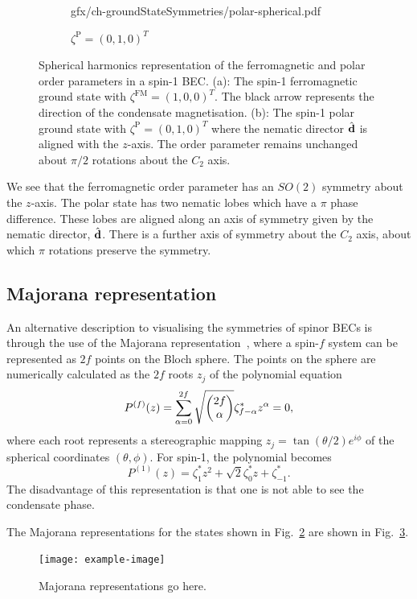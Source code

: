 \begin{figure}
\begin{subfigure}{0.49\textwidth}
        {gfx/ch-groundStateSymmetries/polar-spherical.pdf}
        \caption{\label{subfig: spin-1-polar-spherical}
        \(\zeta^\mathrm{P}={(0, 1, 0)}^T\)}
    \end{subfigure}
    \caption{\label{fig: spin-1-spherical-harmonics}
    Spherical harmonics representation of the ferromagnetic and polar order
    parameters in a spin-1 BEC.\@
    (a): The spin-1 ferromagnetic ground state with
    \(\zeta^\mathrm{FM}={(1, 0, 0)}^T\).
    The black arrow represents the direction of the condensate magnetisation.
    (b): The spin-1 polar ground state with
    \(\zeta^\mathrm{P}={(0, 1, 0)}^T\) where the nematic director
    \(\hat{\vb{d}}\) is aligned with the \(z\)-axis.
    The order parameter remains unchanged about \(\pi/2\) rotations about the
    \(C_2\) axis.}
\end{figure}
We see that the ferromagnetic order parameter has an \(SO(2)\) symmetry about
the \(z\)-axis.
The polar state has two nematic lobes which have a \(\pi \) phase difference.
These lobes are aligned along an axis of symmetry given by the nematic director,
\(\hat{\vb{d}}\).
There is a further axis of symmetry about the \(C_2\) axis, about which \(\pi \)
rotations preserve the symmetry.

\subsection{Majorana representation}
An alternative description to visualising the symmetries of spinor BECs is
through the use of the Majorana representation~\cite{Majorana1932,Bloch1945},
where a spin-\(f\) system can be represented as \(2f\) points on the Bloch
sphere.
The points on the sphere are numerically calculated as the \(2f\) roots
\(z_j\) of the polynomial equation
\begin{equation}
    P^{(f)}(z) = \sum_{\alpha = 0}^{2f}
    \sqrt{\mqty(2f \\ \alpha)}\zeta_{f-\alpha}^*z^\alpha=0,
\end{equation}
where each root represents a stereographic mapping
\(z_j=\tan(\theta/2)e^{i\phi}\) of the spherical coordinates \((\theta, \phi)\).
For spin-1, the polynomial becomes
\begin{equation}
    P^{(1)}(z) = \zeta_1^*z^2+\sqrt{2}\zeta_0^*z+\zeta_{-1}^*.
\end{equation}
The disadvantage of this representation is that one is not able to see the
condensate phase.

The Majorana representations for the states shown in
Fig.~\ref{fig: spin-1-spherical-harmonics} are shown in
Fig.~\ref{fig: spin-1-majorana}.
\begin{figure}
    \centering
    \texttt{[image: example-image]}
    \caption{\label{fig: spin-1-majorana}Majorana representations go here.}
\end{figure}

